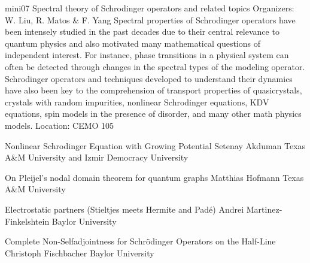 \mini
{mini07}
{Spectral theory of Schrodinger operators and related topics}
{Organizers: W. Liu, R. Matos \& F. Yang}
{Spectral properties of Schrodinger operators have been intensely studied in the past decades due to their central relevance to quantum physics and also motivated many mathematical questions of independent interest. For instance, phase transitions in a physical system can often be detected through changes in the spectral types of the modeling operator. Schrodinger operators and techniques developed to understand their dynamics have also been key to the comprehension of transport properties of quasicrystals, crystals with random impurities, nonlinear Schrodinger equations, KDV equations, spin models in the presence of disorder, and many other math physics models.}
{Location: CEMO 105}

\begin{talks}
\item\talk
{Nonlinear Schrodinger Equation with Growing Potential}
{Setenay Akduman}
{Texas A\&M University and Izmir Democracy University}
\item\talk
{On Pleijel's nodal domain theorem for quantum graphs}
{Matthias Hofmann}
{Texas A\&M University}
\item\talk
{Electrostatic partners (Stieltjes meets Hermite and Padé)}
{Andrei Martinez-Finkelshtein}
{Baylor University}
\item\talk
{Complete Non-Selfadjointness for Schr\"odinger Operators on the Half-Line}
{Christoph Fischbacher}
{Baylor University}
\end{talks}
\room
